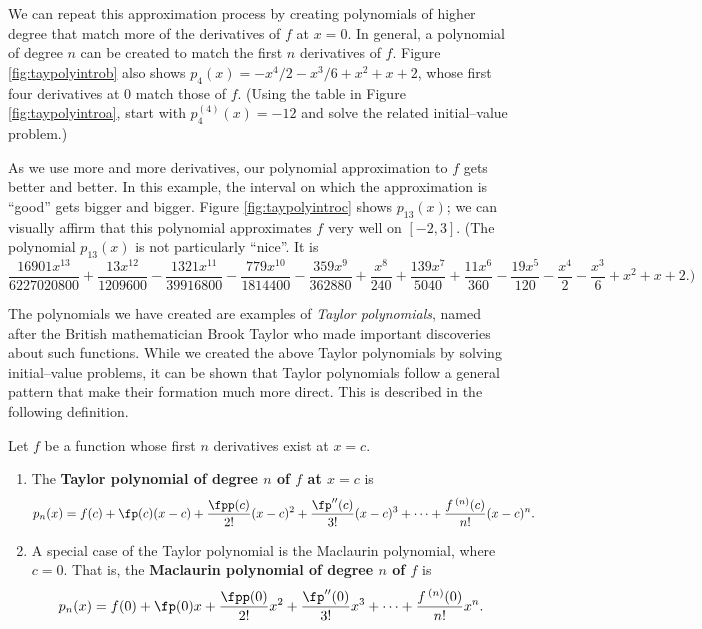 
We can repeat this approximation process by creating polynomials of higher degree that match more of the derivatives of $f$ at $x=0$. In general, a polynomial of degree $n$ can be created to match the first $n$ derivatives of $f$. Figure \ref{fig:taypolyintrob} also shows $p_4(x)= -x^4/2-x^3/6+x^2+x+2$, whose first four derivatives at 0 match those of $f$. (Using the table in Figure \ref{fig:taypolyintroa}, start with $p_4^{(4)}(x)=-12$ and solve the related initial--value problem.)

As we use more and more derivatives, our polynomial approximation to $f$ gets better and better. In this example, the interval on which the approximation is ``good'' gets bigger and bigger. Figure \ref{fig:taypolyintroc} shows $p_{13}(x)$; we can visually affirm that this polynomial approximates $f$ very well on $[-2,3]$. (The polynomial $p_{13}(x)$ is not particularly ``nice''. It is {\scriptsize $$ \frac{16901x^{13}}{6227020800}+\frac{13x^{12}}{1209600}-\frac{1321x^{11}}{39916800}-\frac{779x^{10}}{1814400}-\frac{359x^9}{362880}+\frac{x^8}{240}+\frac{139x^7}{5040}+\frac{11 x^6}{360}-\frac{19x^5}{120}-\frac{x^4}{2}-\frac{x^3}{6}+x^2+x+2\text{.)}$$}

The polynomials we have created are examples of \emph{Taylor polynomials}, named after the British mathematician Brook Taylor who made important discoveries about such functions. While we created the above Taylor polynomials by solving initial--value problems, it can be shown that Taylor polynomials follow a general pattern that make their formation much more direct. This is described in the following definition.

\setboxwidth{50pt}
\noindent\hskip-50pt
\begin{minipage}{\specialboxlength}
{Let $f$ be a function whose first $n$ derivatives exist at $x=c$.
 
\begin{enumerate}
\item		The \textbf{Taylor polynomial of degree $n$ of $f$ at $x=c$} is 
				{$$p_n(x) = f(c) + \fp(c)(x-c) + \frac{\fpp(c)}{2!}(x-c)^2+\frac{\fp''(c)}{3!}(x-c)^3+\cdots+\frac{f\,^{(n)}(c)}{n!}(x-c)^n.$$}

\item		A special case of the Taylor polynomial is the Maclaurin polynomial, where $c=0$. That is, the \textbf{Maclaurin polynomial of degree $n$ of $f$} is 
{$$p_n(x) = f(0) + \fp(0)x + \frac{\fpp(0)}{2!}x^2+\frac{\fp''(0)}{3!}x^3+\cdots+\frac{f\,^{(n)}(0)}{n!}x^n.$$}
\end{enumerate}
}
\end{minipage}
\restoreboxwidth


